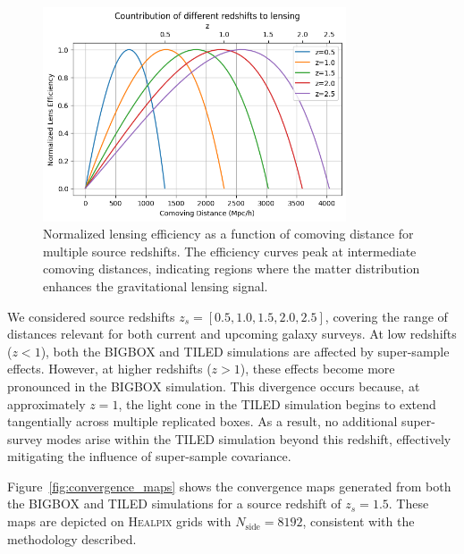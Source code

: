 \begin{figure}[ht]
    \centering
    \includegraphics[width=0.8\textwidth]{figures/lensefficiency.png}
    \caption[Normalized lensing efficiency for multiple source redshifts]{Normalized lensing efficiency as a function of comoving distance for multiple source redshifts. The efficiency curves peak at intermediate comoving distances, indicating regions where the matter distribution enhances the gravitational lensing signal.}
    \label{fig:lensing_efficiency}
\end{figure}

We considered source redshifts $z_s = [0.5, 1.0, 1.5, 2.0, 2.5]$, covering the range of distances relevant for both current and upcoming galaxy surveys. At low redshifts ($z < 1$), both the BIGBOX and TILED simulations are affected by super-sample effects. However, at higher redshifts ($z > 1$), these effects become more pronounced in the BIGBOX simulation. This divergence occurs because, at approximately $z = 1$, the light cone in the TILED simulation begins to extend tangentially across multiple replicated boxes. As a result, no additional super-survey modes arise within the TILED simulation beyond this redshift, effectively mitigating the influence of super-sample covariance.

Figure~\ref{fig:convergence_maps} shows the convergence maps generated from both the BIGBOX and TILED simulations for a source redshift of $z_s = 1.5$. These maps are depicted on \textsc{Healpix} grids with $N_{\text{side}} = 8192$, consistent with the methodology described.

